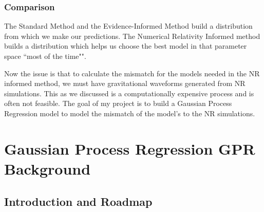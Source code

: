 \documentclass{article}
\begin{document}
\subsubsection*{Comparison}
The Standard Method and the Evidence-Informed Method build a distribution from which we make our predictions. The Numerical Relativity Informed method builds a distribution which helps us choose the best model in that parameter space ``most of the time"".

\noindent
Now the issue is that to calculate the mismatch for the models needed in the NR informed method, we must have gravitational waveforms generated from NR simulations. This as we discussed is a computationally expensive process and is often not feasible. The goal of my project is to build a Gaussian Process Regression model to model the mismatch of the model's to the NR simulations.

\section{Gaussian Process Regression \textbf{GPR} Background}
\subsection{Introduction and Roadmap}
\end{document}

